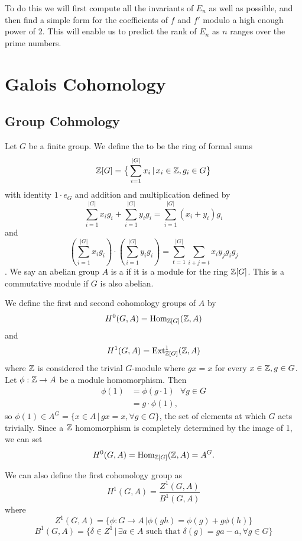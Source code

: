 \documentclass[12pt, a4paper]{amsart}
\begin{document}
To do this we will first compute all the invariants of $E_n$ as well as
possible, and then find a simple form for the coefficients of $f$ and $f'$ modulo
a high enough power of 2. This will enable us to predict the rank of $E_n$ as
$n$ ranges over the prime numbers.

\section{Galois Cohomology}

\subsection{Group Cohmology}

Let $G$ be a finite group. We define the  to
be the ring of formal sums
\[ {\mathbb Z}[G] = \big\{ \sum\limits_{i=1}^{|G|} x_i \, | \, x_i \in {\mathbb Z}, g_i \in G \big\}\]
with identity $1 \cdot e_G$ and addition and multiplication defined by
\[\sum\limits_{i=1}^{|G|} x_ig_i + \sum\limits_{i=1}^{|G|} y_ig_i =
\sum\limits_{i=1}^{|G|} (x_i+y_i)g_i\]
and \[(\sum\limits_{i=1}^{|G|} x_ig_i) \cdot (\sum\limits_{i=1}^{|G|} y_ig_i) =
\sum\limits_{t=1}^{|G|} \sum\limits_{i+j = t} x_iy_jg_ig_j \].
We say an abelian group $A$ is a  if it is a module
for the ring ${\mathbb Z}[G]$. This is a commutative module if $G$ is also abelian.

We define the
first and second cohomology groups of $A$ by
\[H^0 (G, A) = \text{Hom}_{{\mathbb Z}[G]}({\mathbb Z}, A)\] and
\[H^1 (G, A) = \text{Ext}^1_{{\mathbb Z}[G]} ({\mathbb Z}, A)\]
where ${\mathbb Z}$ is considered the trivial $G$-module where $g x = x$ for every
$x \in {\mathbb Z}, g \in G$.
Let $\phi : {\mathbb Z} \rightarrow A$ be a module homomorphism. Then
\[\begin{split} \phi(1) &= \phi(g \cdot 1) \,\,\,\, \forall g \in G \\
    &= g \cdot \phi(1) , \end{split}\]
so $\phi(1) \in A^G = \{x \in A \, | \, gx = x, \forall g \in G\}$, the set
of elements at which $G$ acts trivially. Since a ${\mathbb Z}$ homomorphism is
completely determined by the image of 1, we can set
\[ H^0 (G, A) = \text{Hom}_{{\mathbb Z}[G]}({\mathbb Z}, A) = A^G .\] 

We can also define the first cohomology group as
\[H^1(G, A) = \frac{Z^1(G,A)}{B^1(G,A)}\]
where
\[Z^1(G,A) = \{ \phi : G \rightarrow A \, | \phi(gh) = \phi(g) + g \phi(h)\}\]
\[B^1(G,A) = \{ \delta \in Z^1 \, | \, \exists a \in A \,\,\text{such that}\,\, \delta(g)
  = ga - a , \forall g \in G\}\]
\end{document}
